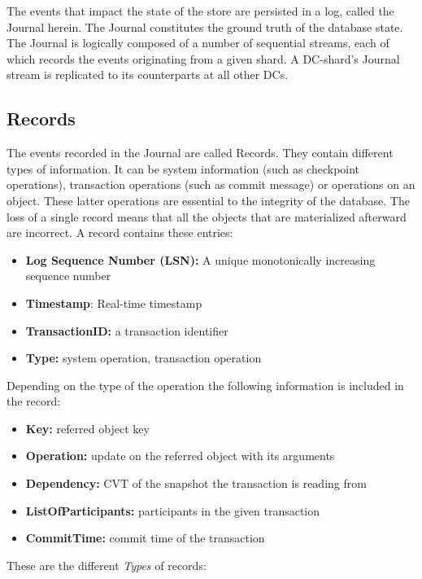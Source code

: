 \documentclass[twoside]{article}
\begin{document}
The events that impact the state of the store are persisted in a log, called the
Journal herein. 
The Journal constitutes the ground truth of the database state. 
The Journal is logically composed of a number of sequential streams, each of
which records the events originating from a given shard. 
A DC-shard’s Journal stream is replicated to its counterparts at all other DCs. 

\subsection{Records}
\label{sec:record}

The events recorded in the Journal are called Records.
They contain different types of information. 
It can be system information (such as checkpoint operations), transaction
operations (such as commit message) or operations on an object.
These latter operations are essential to the integrity of the database.
The loss of a single record means that all the objects that are materialized
afterward are incorrect.
A record contains these entries:
\begin{itemize}
  \item \textbf{Log Sequence Number (LSN):} A unique monotonically increasing 
  sequence number
  \item \textbf{Timestamp}: Real-time timestamp 
  \item \textbf{TransactionID:} a transaction identifier 
  \item \textbf{Type:} system operation, transaction operation
\end{itemize}
Depending on the type of the operation the following information is included
in the record:
\begin{itemize}
  \item \textbf{Key:} referred object key
  \item \textbf{Operation:} update on the referred object with its arguments
  \item \textbf{Dependency:} CVT of the snapshot the transaction is reading from
  \item \textbf{ListOfParticipants:} participants in the given transaction
  \item \textbf{CommitTime:} commit time of the transaction
\end{itemize}

These are the different \textit{Types} of records:
\end{document}
